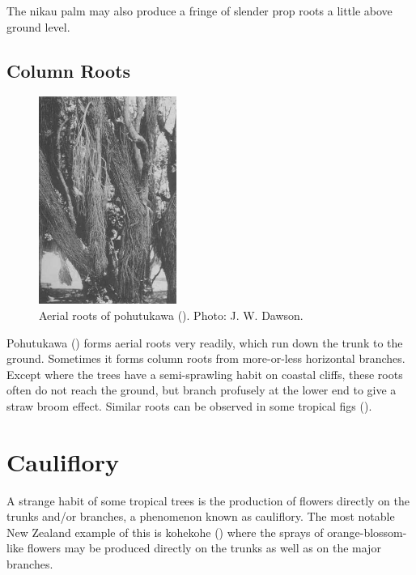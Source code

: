 The nikau palm may also produce a fringe of slender prop roots a little above ground level.

\subsection{Column Roots}

\begin{figure}
	\includegraphics[width=0.4\textwidth]{graphics/figure15pohutakawa.jpg}
	\centering
	\caption[Aerial roots of pohutukawa]{Aerial roots of pohutukawa ().
    Photo:  J. W. Dawson.}
	\label{fig:15pohutakawa}
\end{figure}

Pohutukawa () forms aerial roots very readily, which run down the trunk to the ground.
Sometimes it forms column roots from more-or-less horizontal branches.
Except where the trees have a semi-sprawling habit on coastal cliffs, these roots often do not reach the ground, but branch profusely at the lower end to give a straw broom effect.
Similar roots can be observed in some tropical figs ().

\section{Cauliflory}

A strange habit of some tropical trees is the production of flowers directly on the trunks and/or branches, a phenomenon known as cauliflory.
The most notable New Zealand example of this is kohekohe () where the sprays of orange-blossom-like flowers may be produced directly on the trunks as well as on the major branches.

